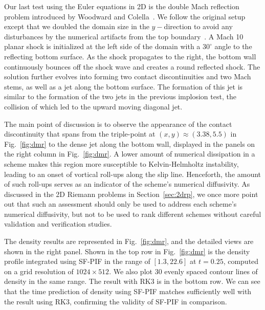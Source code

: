 \documentclass[times,preprint,3p]{elsarticle}
\begin{document}
Our last test using the Euler equations in 2D
is the double Mach reflection problem introduced by
Woodward and Colella~\cite{woodward1984numerical}.
We follow the original setup except that we doubled the domain size
in the \( y-\)direction to avoid any disturbances by the numerical artifacts
from the top boundary~\cite{kemm2016proper}.
%
A Mach 10 planar shock is initialized at the left side of the domain
with a $30^{\circ}$ angle to the reflecting bottom surface.
As the shock propagates to the right, the bottom wall continuously
bounces off the shock wave and creates a round reflected shock.
The solution further evolves into forming
two contact discontinuities and two Mach stems,
as well as a jet along the bottom surface.
The formation of this jet is similar to the formation of the two jets
in the previous implosion test,
the collision of which led to the upward moving diagonal jet.



The main point of discussion is to observe
the appearance of the contact discontinuity
that spans from the triple-point at $(x,y)\approx (3.38,5.5)$
in Fig.~\ref{fig:dmr} to the dense jet along the bottom wall,
displayed in the panels on the right column
in Fig.~\ref{fig:dmr}.
A lower amount of numerical
dissipation in a scheme makes
this region more susceptible to
Kelvin-Helmholtz instability, leading to an onset of
vortical roll-ups along the slip line.
Henceforth, the amount of such roll-ups serves
as an indicator of the scheme's numerical diffusivity.
As discussed in the 2D Riemann problems in Section~\ref{sec:2drp},
we once more point out that
such an assessment should only be used to address each scheme's
numerical diffusivity, but not to be used to rank different schemes
without careful validation and verification studies.



The density results are represented in Fig.~\ref{fig:dmr},
and the detailed views are shown
in the right panel.
Shown in the top row in Fig.~\ref{fig:dmr} is the density profile
integrated using SF-PIF
in the range of \( [1.3, 22.6] \) at $t=0.25$,
computed on a grid resolution of \( 1024 \times 512 \).
We also plot 30 evenly spaced contour lines of density in the
same range. The result with RK3 is in the bottom row.
We can see that the time prediction of density using SF-PIF matches
sufficiently well with the result using RK3,
confirming the validity of SF-PIF in comparison.
%
%
\end{document}
